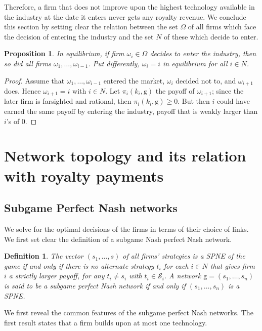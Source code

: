 \documentclass{article}
\newtheorem{proposition}{Proposition}
\newtheorem{definition}{Definition}
\begin{document}
Therefore, a firm that does not improve upon the highest technology available in the industry at the date it enters never gets any royalty revenue. We conclude this section by setting clear the relation between the set $\Omega$ of all firms which face the decision of entering the industry and the set $N$ of these which decide to enter. 

\begin{proposition}
In equilibrium, if firm $\omega_i\in \Omega$ decides to enter the industry, then so did all firms $\omega_1,\ldots, \omega_{i-1}$. Put differently, $\omega_i=i$ in equilibrium for all $i\in N$. 
\end{proposition}
\begin{proof}
Assume that $\omega_1,\ldots, \omega_{i-1}$ entered the market, $\omega_i$ decided not to, and $\omega_{i+1}$ does. Hence $\omega_{i+1}=i$ with $i\in N$. Let $\pi_i(k_i,\text{g})$ the payoff of $\omega_{i+1}$; since the later firm is farsighted and rational, then $\pi_i(k_i,\text{g})\geq 0$. But then $i$ could have earned the same payoff by entering the industry, payoff that is weakly larger than $i$'s of 0. 
\end{proof}

\section{Network topology and its relation with royalty payments}
 \subsection{Subgame Perfect Nash networks}
We solve for the optimal decisions of the firms in terms of their choice of links. We first set clear the definition of a subgame Nash perfect Nash network. 

\begin{definition}
The vector $(s_1,\ldots,s)$ of all firms' strategies is a SPNE of the game if and only if there is no alternate strategy $t_i$ for each $i\in N$ that gives firm $i$ a strictly larger payoff, for any $t_i\neq s_i$ with $t_i\in \mathcal{S}_i$. A network $\text{g}=(s_1,\ldots, s_n)$ is said to be a subgame perfect Nash network if and only if $(s_1,\ldots, s_n)$ is a SPNE. 
\end{definition}

We first reveal the common features of the subgame perfect Nash networks. The first result states that a firm builds upon at most one technology. 
\end{document}
